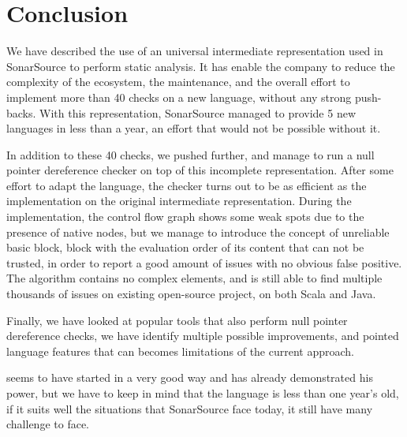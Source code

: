 \section{Conclusion}
\label{sec:conclusion}

We have described the use of an universal intermediate representation used in SonarSource to perform static analysis.
It has enable the company to reduce the complexity of the ecosystem, the maintenance, and the overall effort to implement more than 40 checks on a new language, without any strong push-backs.
With this representation, SonarSource managed to provide 5 new languages in less than a year, an effort that would not be possible without it.

In addition to these 40 checks, we pushed \slang{} further, and manage to run a null pointer dereference checker on top of this incomplete representation. 
After some effort to adapt the language, the checker turns out to be as efficient as the implementation on the original intermediate representation.
During the implementation, the control flow graph shows some weak spots due to the presence of native nodes, but we manage to introduce the concept of unreliable basic block, block with the evaluation order of its content that can not be trusted, in order to report a good amount of issues with no obvious false positive.
The algorithm contains no complex elements, and is still able to find multiple thousands of issues on existing open-source project, on both Scala and Java.

Finally, we have looked at popular tools that also perform null pointer dereference checks, we have identify multiple possible improvements, and pointed language features that can becomes limitations of the current approach.

\slang{} seems to have started in a very good way and has already demonstrated his power, but we have to keep in mind that the language is less than one year's old, if it suits well the situations that SonarSource face today, it still have many challenge to face.
